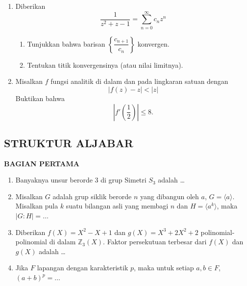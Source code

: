 \documentclass[12pt,twoside]{article}
\begin{document}
\begin{enumerate}
	\item Diberikan
	      \begin{equation*}
		      \dfrac{1}{z^2+z-1} = \displaystyle\sum_{n=0}^{\infty} c_nz^n
	      \end{equation*}
	      \begin{enumerate}
		      \item Tunjukkan bahwa barisan $\left\lbrace \dfrac{c_{n+1}}{c_n} \right\rbrace$ konvergen.

		      \item Tentukan titik konvergensinya (atau nilai limitnya).
	      \end{enumerate}

	\item Misalkan $f$ fungsi analitik di dalam dan pada lingkaran satuan dengan
	      \begin{equation*}
		      |f(z)-z|<|z|
	      \end{equation*}
	      Buktikan bahwa
	      \begin{equation*}
		      \left|f'\left(\dfrac{1}{2}\right)\right| \leq 8.
	      \end{equation*}
\end{enumerate}

\newpage
\subsection{STRUKTUR ALJABAR}
\textbf{BAGIAN PERTAMA}
\begin{enumerate}
	\item Banyaknya unsur berorde 3 di grup Simetri \( S_3 \) adalah \dots

	\item Misalkan \( G \) adalah grup siklik berorde \( n \) yang dibangun oleh \( a \), \( G = \langle a \rangle \). Misalkan pula \( k \) suatu bilangan asli yang membagi \( n \) dan \( H = \langle a^k \rangle \), maka \( |G : H| = \dots \)

	\item Diberikan \( f(X) = X^2 - X + 1 \) dan \( g(X) = X^3 + 2X^2 + 2 \) polinomial-polinomial di dalam \( \mathbb{Z}_3(X) \). Faktor persekutuan terbesar dari \( f(X) \) dan \( g(X) \) adalah \dots

	\item Jika \( F \) lapangan dengan karakteristik \( p \), maka untuk setiap \( a, b \in F \), \((a + b)^p = \dots \)
\end{enumerate}
\end{document}
